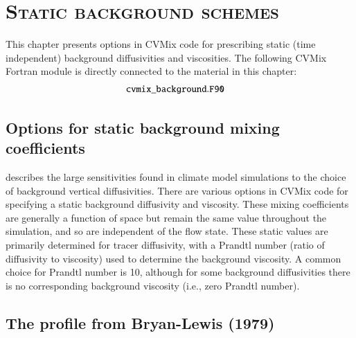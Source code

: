 \chapter{\scshape Static background schemes}
\label{chapter:cvmix_background}


\minitoc
\vspace{.5cm}

\begin{mdframed}[backgroundcolor=lightgray!50]
This chapter presents options in CVMix code for prescribing static
(time independent) background diffusivities and viscosities.  The
following CVMix Fortran module is directly connected to the material
in this chapter:
\begin{align*} 
 &{\tt cvmix\_background.F90}
\end{align*}
\end{mdframed}

\section{Options for static background mixing coefficients}
\label{section:background-diffusivities}

\cite{Jochum2009} describes the large sensitivities found in climate
model simulations to the choice of background vertical diffusivities.
There are various options in CVMix code for specifying a static
background diffusivity and viscosity.  These mixing coefficients are
generally a function of space but remain the same value throughout the
simulation, and so are independent of the flow state.  These static
values are primarily determined for tracer diffusivity, with a Prandtl
number (ratio of diffusivity to viscosity) used to determine the
background viscosity.  A common choice for Prandtl number is 10,
although for some background diffusivities there is no corresponding
background viscosity (i.e., zero Prandtl number).


\section{The profile from Bryan-Lewis (1979)} 
\label{section:bryan-lewis}

